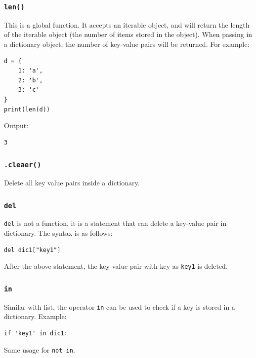 \documentclass[12pt]{book}
\begin{document}
\subsubsection{\texttt{len()}}
\label{sec:orge3ef527}
This is a global function. It accepts an iterable object, and will return the length of the iterable object (the number of items stored in the object). When passing in a dictionary object, the number of key-value pairs will be returned. For example:
\begin{verbatim}
d = {
    1: 'a',
    2: 'b',
    3: 'c'
}
print(len(d))
\end{verbatim}
Output:
\begin{verbatim}
3
\end{verbatim}
\subsubsection{\texttt{.cleaer()}}
\label{sec:org149e58b}
Delete all key value pairs inside a dictionary.
\subsubsection{\texttt{del}}
\label{sec:orgf1200a1}
\texttt{del} is not a function, it is a statement that can delete a key-value pair in dictionary. The syntax is as follows:
\begin{verbatim}
del dic1["key1"]
\end{verbatim}
After the above statement, the key-value pair with key as \texttt{key1} is deleted.
\subsubsection{\texttt{in}}
\label{sec:orgb2fd850}
Similar with list, the operator \texttt{in} can be used to check if a key is stored in a dictionary. Example:
\begin{verbatim}
if 'key1' in dic1:
\end{verbatim}
Same usage for \texttt{not in}.
\end{document}
